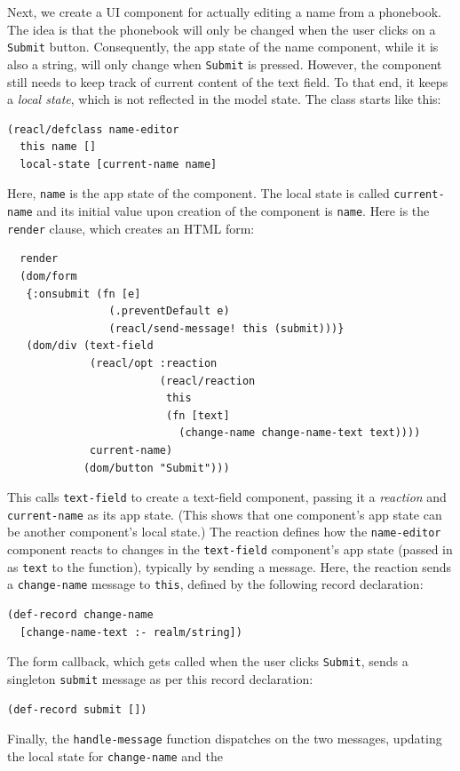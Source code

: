 \documentclass[sigplan,screen]{acmart}
\begin{document}
Next, we create a UI component for actually editing a name from a
phonebook.  The idea is that the phonebook will only be changed when
the user clicks on a \texttt{Submit} button.  Consequently, the app
state of the name component, while it is also a string, will only
change when \texttt{Submit} is pressed.  However, the component still
needs to keep track of current content of the text field.  To that
end, it keeps a \textit{local state}, which is not reflected in the
model state.  The class starts like this:
%
\begin{verbatim}
(reacl/defclass name-editor
  this name []
  local-state [current-name name]
\end{verbatim}
%
Here, \texttt{name} is the app state of the component.  The local
state is called \texttt{current-name} and its initial value upon
creation of the component is \texttt{name}.  Here is the
\texttt{render} clause, which creates an HTML form:
%
\begin{verbatim}
  render
  (dom/form
   {:onsubmit (fn [e]
                (.preventDefault e)
                (reacl/send-message! this (submit)))}
   (dom/div (text-field
             (reacl/opt :reaction
                        (reacl/reaction
                         this
                         (fn [text]
                           (change-name change-name-text text))))
             current-name)
            (dom/button "Submit")))
\end{verbatim}
%
This calls \texttt{text-field} to create a text-field component,
passing it a \textit{reaction} and \texttt{current-name} as its app
state.  (This shows that one component's app state can be another
component's local state.)  The reaction defines how the
\texttt{name-editor} component reacts to changes in the
\texttt{text-field} component's app state (passed in as \texttt{text}
to the function), typically by sending a message.  Here, the reaction
sends a \texttt{change-name} message to \texttt{this}, defined by the
following record declaration:
%
\begin{verbatim}
(def-record change-name
  [change-name-text :- realm/string])
\end{verbatim}
%
The form callback, which gets called when the user clicks
\texttt{Submit}, sends a singleton \texttt{submit} message as per this
record declaration:
%
\begin{verbatim}
(def-record submit [])
\end{verbatim}
%
Finally, the \texttt{handle-message} function dispatches on the two
messages, updating the local state for \texttt{change-name} and the
\end{document}
